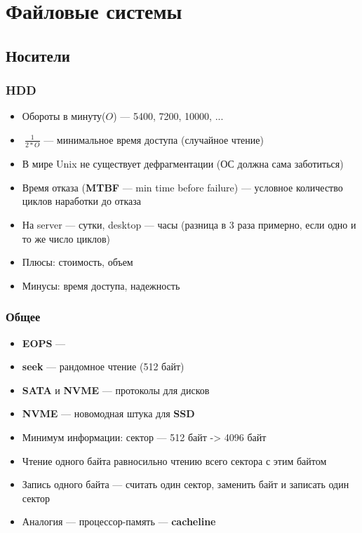 \documentclass[../../lectures.tex]{subfiles}
\begin{document}
\chapter{Файловые системы}

\section{Носители}
\subsection{HDD}
\begin{itemize}
    \item Обороты в минуту($O$) --- 5400, 7200, 10000, ...
    \item $~\frac{1}{2 * O}$ --- минимальное время доступа (случайное чтение)
    \item В мире Unix не существует дефрагментации (ОС должна сама заботиться)
    \item Время отказа (\textbf{MTBF} --- min time before failure) --- условное 
          количество циклов наработки до отказа
    \item На server --- сутки, desktop --- часы (разница в 3 раза примерно, 
          если одно и то же число циклов)
    \item Плюсы: стоимость, объем
    \item Минусы: время доступа, надежность
\end{itemize}

\subsection{Общее}
\begin{itemize}
    \item \textbf{EOPS} --- \todo{}
    \item \textbf{seek} --- рандомное чтение (512 байт)
    \item \textbf{SATA} и \textbf{NVME} --- протоколы для дисков
    \item \textbf{NVME} --- новомодная штука для \textbf{SSD}
    \item Минимум информации: сектор --- 512 байт -> 4096 байт
    \item Чтение одного байта равносильно чтению всего сектора с этим байтом
    \item Запись одного байта --- считать один сектор, заменить байт и записать один сектор
    \item Аналогия --- процессор-память --- \textbf{cacheline}
\end{itemize}
\end{document}
